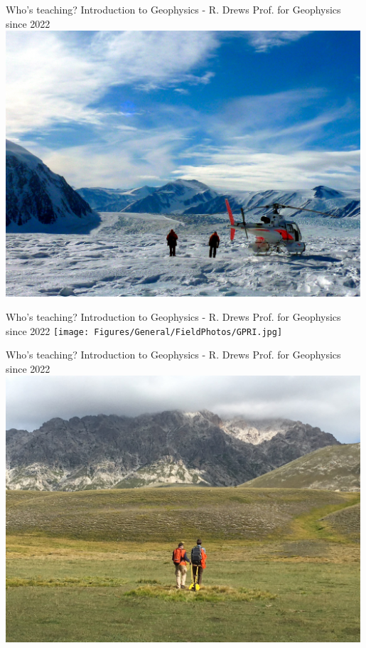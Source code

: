 \begin{frame}
    \begin{PointSix}{Who's teaching?}
        \alert{Introduction to Geophysics - R. Drews}
        \small Prof. for Geophysics since 2022
        \includegraphics[width=0.99\textwidth]{Figures/General/FieldPhotos/PriestleyHelicopter.JPG}
      \end{PointSix}
\end{frame}

\begin{frame}
    \begin{PointSix}{Who's teaching?}
        \alert{Introduction to Geophysics - R. Drews}
        \small Prof. for Geophysics since 2022
        \texttt{[image: Figures/General/FieldPhotos/GPRI.jpg]}
      \end{PointSix}
\end{frame}

\begin{frame}
    \begin{PointSix}{Who's teaching?}
        \alert{Introduction to Geophysics - R. Drews}
        \small Prof. for Geophysics since 2022
        \includegraphics[width=0.99\textwidth]{Figures/General/FieldPhotos/ApenninsGPR.jpg}
      \end{PointSix}
\end{frame}


